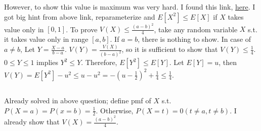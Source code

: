 \documentclass{article}
\begin{document}
However, to show this value is maximum was very hard.
I found this link, \href{https://stats.stackexchange.com/questions/45588/variance-of-a-bounded-random-variable}{here}.
I got big hint from above link, reparameterize and $E[X^2] \leq E[X]$ if $X$ takes value only in $[0,1]$.
To prove $V(X) \leq \frac{(a-b)^2}{4}$, take any random variable $X$ s.t. it takes value only in range $[a,b]$.
If $a=b$, there is nothing to show.
In case of $a \neq b$, Let $Y=\frac{X-a}{b-a}$.
$V(Y)=\frac{V(X)}{(b-a)^2}$, so it is sufficient to show that $V(Y) \leq \frac{1}{4}$.
$0 \leq Y \leq 1$ implies $Y^2 \leq Y$.
Therefore, $E[Y^2] \leq E[Y]$.
Let $E[Y]=u$, then
$V(Y) = E[Y^2] - u^2
\leq u - u^2
= -(u-\frac{1}{2})^2 + \frac{1}{4}
\leq \frac{1}{4}$.

\subsection{}
Already solved in above question; define pmf of $X$ s.t. $P(X=a)=P(x=b)=\frac{1}{2}$.
Otherwise, $P(X=t)=0 (t \neq a, t \neq b)$.
I already show that $V(X) = \frac{(a-b)^2}{4}$.
\end{document}
